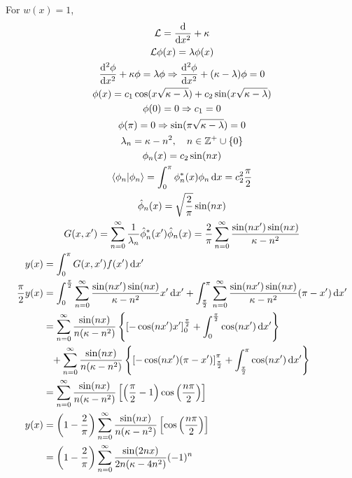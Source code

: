 \documentclass[12pt]{article}
\newcommand*\diff{\mathop{}\!\mathrm{d}}
\newenvironment{problem}[2][Problem]{\begin{trivlist}
\item[\hskip \labelsep {\bfseries #1}\hskip \labelsep {\bfseries #2.}]}{\end{trivlist}}
\begin{document}
\begin{problem}{2}
\end{problem}
For $w(x) = 1$,
\begin{gather*}
	\mathcal{L} = \frac{\diff}{\diff x^2} + \kappa \\
	\mathcal{L}\phi(x) = \lambda \phi(x) \\
	\frac{\diff^2 \phi}{\diff x^2} + \kappa \phi = \lambda \phi
		\Rightarrow \frac{\diff^2 \phi}{\diff x^2} + (\kappa - \lambda) \phi = 0 \\
	\phi(x) = c_1 \cos(x \sqrt{\kappa - \lambda}) 
		+ c_2 \sin(x \sqrt{\kappa - \lambda}) \\
	\phi(0) = 0 \Rightarrow c_1 = 0 \\
	\phi(\pi) = 0 \Rightarrow \sin(\pi \sqrt{\kappa - \lambda}) = 0 \\
	\lambda_n = \kappa - n^2,\quad n \in \mathbb{Z}^+ \cup \{0\} \\
	\phi_n(x) = c_2 \sin (nx) \\
	\braket{\phi_n|\phi_n} = \int_0^\pi \phi_n^* (x) \phi_n \diff x = c_2^2
		\frac{\pi}{2} \\
	\hat{\phi}_n (x) = \sqrt{\frac{2}{\pi}} \sin(nx) \\
	G(x, x') 
		= \sum_{n=0}^\infty 
			\frac{1}{\lambda_n} 
			\hat{\phi}_n^* (x') \hat{\phi}_n (x)
		= \frac{2}{\pi}
			\sum_{n=0}^\infty 
			\frac{\sin(nx') \sin(nx)}
			{\kappa - n^2} 
	\\
	\begin{aligned}
		y(x) &= \int_0^\pi G(x, x') f(x') \diff x' \\
		\frac{\pi}{2} y(x) &= \int_0^{\frac{\pi}{2}} 
				\sum_{n=0}^\infty 
				\frac{\sin(nx') \sin(nx)}
				{\kappa - n^2} 
				x'
			\diff x'
			+ \int_{\frac{\pi}{2}}^\pi 
				\sum_{n=0}^\infty 
				\frac{\sin(nx') \sin(nx)}
				{\kappa - n^2} 
				(\pi - x')
			\diff x'
		\\
		&= 
			\sum_{n=0}^\infty 
			\frac{\sin(nx)}
			{n(\kappa - n^2)} 
			\left\{
				\left[ - \cos(nx') x' \right]_0^{\frac{\pi}{2}}
				+
				\int_0^{\frac{\pi}{2}} 
					\cos(nx')
				\diff x'
			\right\}
			\\
			&\phantom{=}+
			\sum_{n=0}^\infty 
			\frac{\sin(nx)}
			{n(\kappa - n^2)} 
			\left\{
				\left[ - \cos(nx') (\pi - x') \right]_{\frac{\pi}{2}}^\pi
				+
				\int_{\frac{\pi}{2}}^\pi
					\cos(nx')
				\diff x'
			\right\}
		\\
		&= 
			\sum_{n=0}^\infty 
			\frac{\sin(nx)}
			{n(\kappa - n^2)} 
			\left[
				\left( \frac{\pi}{2} -1 \right)
				\cos \left( \frac{n\pi}{2} \right)
			\right]
		\\
		y(x) &= 
			\left( 1- \frac{2}{\pi} \right)
			\sum_{n=0}^\infty 
			\frac{\sin(nx)}
			{n(\kappa - n^2)} 
			\left[
				\cos \left( \frac{n\pi}{2} \right)
			\right]
		\\
		&= 
			\left( 1- \frac{2}{\pi} \right)
			\sum_{n=0}^\infty 
			\frac{\sin(2nx)}
			{2n(\kappa - 4n^2)} 
			(-1)^n
		\\
	\end{aligned}
	\\
\end{gather*}
\filbreak
\end{document}
